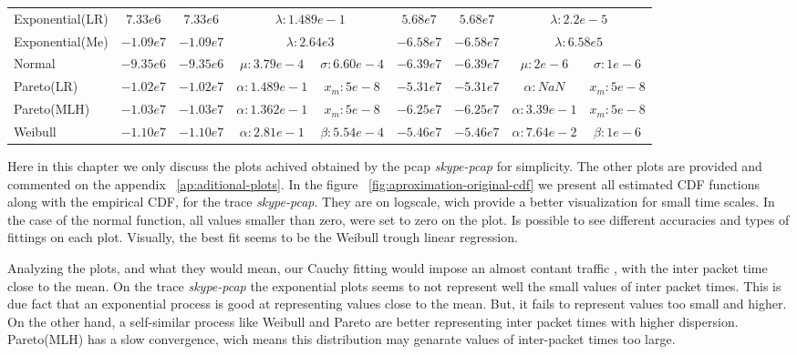 \begin{table}[h!]
{\begin{tabular}{lcccccccc}
			Exponential(LR) & $7.33e6$    & $7.33e6$   & \multicolumn{2}{c}{$\lambda:1.489e-1$}   
			& $5.68e7$    & $ 5.68e7$  & \multicolumn{2}{c}{$\lambda:2.2e-5$}   \\
			Exponential(Me) & $-1.09e7$   & $-1.09e7$  & \multicolumn{2}{c}{$\lambda:2.64e3$}   
			& $-6.58e7$   & $-6.58e7$  & \multicolumn{2}{c}{$\lambda:6.58e5$} \\
			Normal          & $-9.35e6$   & $-9.35e6$  & $\mu:3.79e-4$   &$\sigma:6.60e-4$ 
			& $-6.39e7$   & $-6.39e7$  & $\mu:2e-6$     & $\sigma:1e-6$ \\
			Pareto(LR)      & $-1.02e7$   & $-1.02e7$  & $\alpha:1.489e-1 $ & $x_m:5e-8 $    
			& $-5.31e7$   & $-5.31e7$  & $\alpha:NaN$ & $x_m:5e-8 $    \\
			Pareto(MLH)     & $-1.03e7$   & $-1.03e7$  & $\alpha:1.362e-1$ & $x_m:5e-8 $    
			& $-6.25e7$   & $-6.25e7$  & $\alpha:3.39e-1$ & $x_m:5e-8 $    \\
			Weibull         & $-1.10e7$   & $-1.10e7$  & $\alpha:2.81e-1$ & $\beta:5.54e-4$  
			& $-5.46e7$   & $-5.46e7$  & $\alpha:7.64e-2$ & $\beta:1e-6$  \\ \hline
		\end{tabular}
	}
\end{table}

Here in this chapter we only discuss the plots achived obtained by the pcap \textit{skype-pcap} for simplicity. The other plots are provided and commented on the appendix ~\ref{ap:aditional-plots}. In the figure ~\ref{fig:aproximation-original-cdf} we present all estimated CDF functions along with the empirical CDF, for the trace \textit{skype-pcap}. They are on logscale, wich provide a better visualization for small time scales. In the case of the normal function, all values smaller than zero, were set to zero on the plot. Is possible to see different accuracies and types of fittings on each plot. Visually, the best fit seems to be the Weibull trough linear regression. 

Analyzing the plots, and what they would mean, our Cauchy fitting would impose an almost contant traffic , with the inter packet time close to the mean. On the trace \textit{skype-pcap} the exponential plots seems to not represent well the small values of inter packet times. This is due fact that an exponential process is good at representing values close to the mean. But, it fails to represent values too small and higher. On the other hand, a self-similar process like Weibull and Pareto are better representing inter packet times with higher dispersion. Pareto(MLH) has a slow convergence, wich means this distribution may genarate values of inter-packet times too large. 

